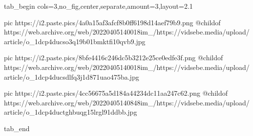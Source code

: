  
 
 
 
 


\ifcmt
  tab_begin cols=3,no_fig,center,separate,amount=3,layout=2.1

     pic https://i2.paste.pics/4a0a15af3afcf8b0ff6198d14aef79b9.png
		 @childof https://web.archive.org/web/20220405140018im_/https://vidsebe.media/upload/article/o_1dcp4ducso3q19b01bmktfi10qvb9.jpg

		 pic https://i2.paste.pics/8bfe4416c246dc5b3212e25ce0edfe3f.png
		 @childof https://web.archive.org/web/20220405140018im_/https://vidsebe.media/upload/article/o_1dcp4ducsdlfq3j1d871uao475ba.jpg 
		 
		 pic https://i2.paste.pics/4cc56675a5d184a44234dc11aa247c62.png
		 @childof https://web.archive.org/web/20220405140848im_/https://vidsebe.media/upload/article/o_1dcp4ductghbuqg15lrgl91ddbb.jpg

  tab_end
\fi
